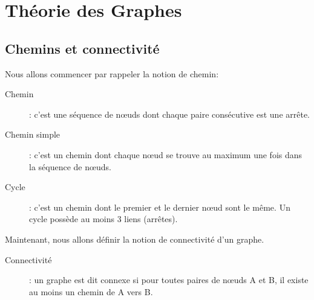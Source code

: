 \chapter{Théorie des Graphes}


\section{Chemins et connectivité}
Nous allons commencer par rappeler la notion de chemin:
	\begin{description}
	\item[Chemin]: c'est une séquence de n\oe uds dont chaque paire consécutive est une arrête.
    \item[Chemin simple]: c'est un chemin dont chaque n\oe ud se trouve au maximum une fois dans la séquence de n\oe uds.
    \item[Cycle]: c'est un chemin dont le premier et le dernier n\oe ud sont le même. Un cycle possède au moins 3 liens (arrêtes).\\
	\end{description}

Maintenant, nous allons définir la notion de connectivité d'un graphe.
	\begin{description}
    \item[Connectivité]: un graphe est dit connexe si pour toutes paires de n\oe uds A et B, il existe au moins un chemin de A vers B.\\
	\end{description}

